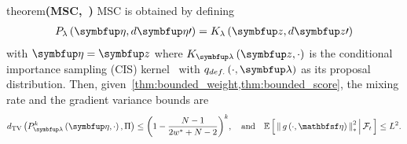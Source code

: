 
\begin{theoremEnd}{theorem}{\textbf{(MSC,~\citealt{NEURIPS2020_b2070693})}}
  MSC is obtained by defining 
  \begin{align*}
  P_{\lambda}\left(\veta, d\veta\prime\right)
  = 
  K_{\lambda}\left(\vz, d\vz\prime\right)
  \end{align*}
  with  \(\veta = \vz\) where \(K_{\vlambda}\left(\vz, \cdot\right)\) is the conditional importance sampling (CIS) kernel~\citep{NEURIPS2020_b2070693} with \(q_{def.}\left(\cdot, \vlambda\right)\) as its proposal distribution.
  Then, given~\cref{thm:bounded_weight,thm:bounded_score}, the mixing rate and the gradient variance bounds are
  \begin{align*}
  \DTV{P_{\vlambda}^k\left(\veta, \cdot\right)}{\Pi} \leq  {\left(1 - \frac{N - 1}{2 w^* + N - 2}\right)}^k,\quad \text{and}\quad
  \E{ \norm{ g\left(\cdot, \rvveta\right) }^2_{*} \,\middle|\, \mathcal{F}_{t} } \leq  L^2.
  \end{align*}
\end{theoremEnd}
